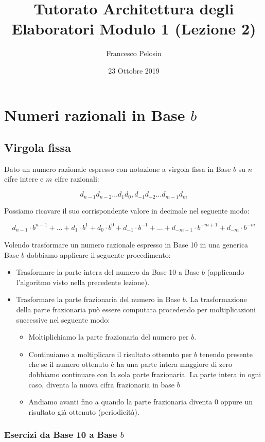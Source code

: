 \documentclass{article}
\title{Tutorato Architettura degli Elaboratori Modulo 1 (Lezione 2)}
\author{Francesco Pelosin }
\date{23 Ottobre 2019}
\begin{document}
\maketitle

\section{Numeri razionali in Base $b$}
\subsection{Virgola fissa}
Dato un numero razionale espresso con notazione a virgola fissa in Base $b$ su $n$ cifre intere e $m$ cifre razionali:

$$d_{n-1} d_{n-2} \dots d_{1} d_{0},d_{-1} d_{-2} \dots d_{m-1} d_{m}$$

\noindent Possiamo ricavare il suo corrispondente valore in decimale nel seguente modo:

$$d_{n-1}\cdot b^{n-1}+\dots +d_{1}\cdot b^{1}+d_{0}\cdot b^{0}+d_{-1}\cdot b^{-1}+\dots +d_{-m+1}\cdot b^{-m+1}+d_{-m}\cdot b^{-m}$$

\noindent Volendo trasformare un numero razionale espresso in Base 10 in una generica Base $b$ dobbiamo applicare il seguente procedimento:
\begin{itemize}
\item Trasformare la parte intera del numero da Base 10 a Base $b$ (applicando l'algoritmo visto nella precedente lezione).
\item Trasformare la parte frazionaria del numero in Base $b$. La trasformazione della parte frazionaria pu\`o essere computata procedendo per moltiplicazioni successive nel seguente modo:
\begin{itemize}
\item Moltiplichiamo la parte frazionaria del numero per $b$.
\item Continuiamo a moltiplicare il risultato ottenuto per $b$ tenendo presente che se il numero ottenuto \`e ha una parte intera maggiore di zero dobbiamo continuare con la sola parte frazionaria. La parte intera in ogni caso, diventa la nuova cifra frazionaria in base $b$
\item Andiamo avanti fino a quando la parte frazionaria diventa 0 oppure un risultato gi\`a ottenuto (periodicit\`a).
\end{itemize}
\end{itemize}

\subsubsection{Esercizi da Base 10 a Base $b$}
\end{document}
